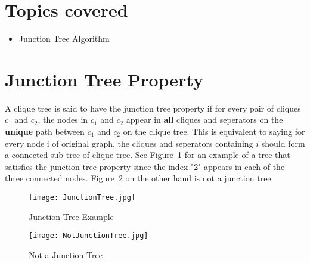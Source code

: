 \documentclass[12pt]{report}
\begin{document}

\maketitle


\section{Topics covered}
\begin{itemize}
\item Junction Tree Algorithm
\end{itemize}

\section{Junction Tree Property}

A clique tree is said to have the junction tree property if for every pair of cliques $c_{1}$ and $c_{2}$, the nodes in $c_{1}$ and $c_{2}$ appear in \textbf{all} cliques and seperators on the \textbf{unique} path between $c_{1}$ and $c_{2}$ on the clique tree. This is equivalent to saying for every node i of original graph, the cliques and seperators containing $i$ should form a connected sub-tree of clique tree. See Figure~\ref{fig:junctionTree} for an example of a tree that satisfies the junction tree property since the index "2" appears in each of the three connected nodes. Figure~\ref{fig:notJunctionTree} on the other hand is not a junction tree.

\begin{figure}
\centering
\texttt{[image: JunctionTree.jpg]}
\caption{Junction Tree Example}
\label{fig:junctionTree}
\end{figure}



\begin{figure}
\centering
\texttt{[image: NotJunctionTree.jpg]}
\caption{Not a Junction Tree}
\label{fig:notJunctionTree}
\end{figure}
\end{document}

